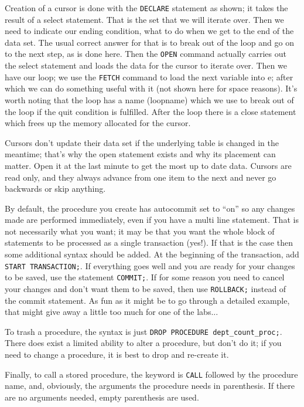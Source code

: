 \documentclass[a4paper]{report}
\begin{document}
Creation of a cursor is done with the \texttt{DECLARE} statement as shown; it takes the result of a select statement. That is the set that we will iterate over. Then we need to indicate our ending condition, what to do when we get to the end of the data set. The usual correct answer for that is to break out of the loop and go on to the next step, as is done here. Then the \texttt{OPEN} command actually carries out the select statement and loads the data for the cursor to iterate over. Then we have our loop; we use the \texttt{FETCH} command to load the next variable into e; after which we can do something useful with it (not shown here for space reasons). It's worth noting that the loop has a name (loopname) which we use to break out of the loop if the quit condition is fulfilled. After the loop there is a close statement which frees up the memory allocated for the cursor.

Cursors don't update their data set if the underlying table is changed in the meantime; that's why the open statement exists and why its placement can matter. Open it at the last minute to get the most up to date data. Cursors are read only, and they always advance from one item to the next and never go backwards or skip anything.

By default, the procedure you create has autocommit set to ``on'' so any changes made are performed immediately, even if you have a multi line statement. That is not necessarily what you want; it may be that you want the whole block of statements to be processed as a single transaction (yes!). If that is the case then some additional syntax should be added. At the beginning of the transaction, add \texttt{START TRANSACTION;}. If everything goes well and you are ready for your changes to be saved, use the statement \texttt{COMMIT;}. If for some reason you need to cancel your changes and don't want them to be saved, then use \texttt{ROLLBACK;} instead of the commit statement. As fun as it might be to go through a detailed example, that might give away a little too much for one of the labs...

To trash a procedure, the syntax is just \texttt{DROP PROCEDURE dept\_count\_proc;}. There does exist a limited ability to alter a procedure, but don't do it; if you need to change a procedure, it is best to drop and re-create it.

Finally, to call a stored procedure, the keyword is \texttt{CALL} followed by the procedure name, and, obviously, the arguments the procedure needs in parenthesis. If there are no arguments needed, empty parenthesis are used.
\end{document}
